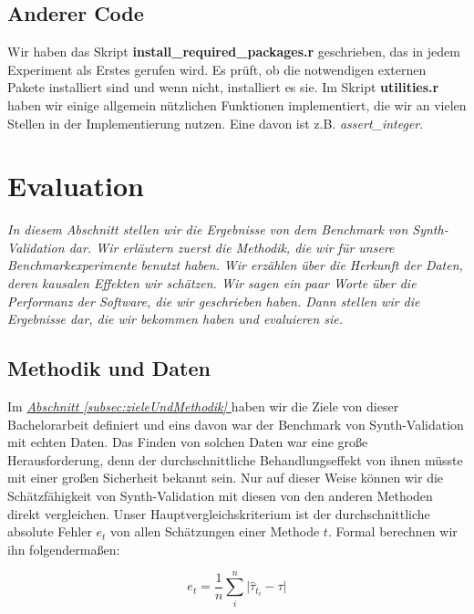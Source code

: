 \documentclass[12pt,a4paper,twoside]{scrartcl}
\numberwithin{equation}{section}
\newcommand{\refsec}[1]{\emph{\hyperref[#1]{Abschnitt \ref*{#1} }}}
\begin{document}
\subsection{Anderer Code}\label{subsec:andererCode}
Wir haben das Skript \textbf{install\_required\_packages.r} geschrieben, das in jedem Experiment als Erstes gerufen wird. Es prüft, ob die notwendigen externen Pakete installiert sind und wenn nicht, installiert es sie. Im Skript \textbf{utilities.r} haben wir einige allgemein nützlichen Funktionen implementiert, die wir an vielen Stellen in der Implementierung nutzen. Eine davon ist z.B. \emph{assert\_integer}.

\clearpage

\section{Evaluation}\label{sec:evaluation}
\noindent
\emph{In diesem Abschnitt stellen wir die Ergebnisse von dem Benchmark von Synth-Validation dar. Wir erläutern zuerst die Methodik, die wir für unsere Benchmarkexperimente benutzt haben. Wir erzählen über die Herkunft der Daten, deren kausalen Effekten wir schätzen. Wir sagen ein paar Worte über die Performanz der Software, die wir geschrieben haben. Dann stellen wir die Ergebnisse dar, die wir bekommen haben und evaluieren sie.}\par

\subsection{Methodik und Daten}\label{subsec:methodikDaten}
Im \refsec{subsec:zieleUndMethodik} haben wir die Ziele von dieser Bachelorarbeit definiert und eins davon war der Benchmark von Synth-Validation mit echten Daten. Das Finden von solchen Daten war eine große Herausforderung, denn der durchschnittliche Behandlungseffekt von ihnen müsste mit einer großen Sicherheit bekannt sein. Nur auf dieser Weise können wir die Schätzfähigkeit von Synth-Validation mit diesen von den anderen Methoden direkt vergleichen. Unser Hauptvergleichskriterium ist der durchschnittliche absolute Fehler $e_t$ von allen Schätzungen einer Methode $t$. Formal berechnen wir ihn folgendermaßen:\par

\begin{equation}\label{eq:5.1}
 e_t = \frac{1}{n} \sum_{i}^n \big | \hat{\tau}_{t_i} - \tau \big | 
\end{equation}
\end{document}
